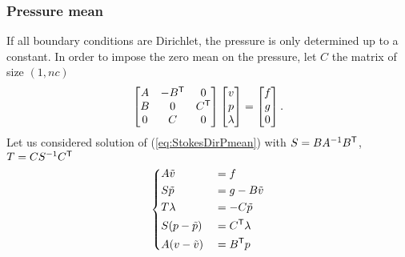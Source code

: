 \subsubsection{Pressure mean}
%
If all boundary conditions are Dirichlet, the pressure is only determined up to a constant. In order to impose the zero mean on the pressure, let $C$ the matrix of size $(1,nc)$
%
\begin{equation}\label{eq:StokesDirPmean}
\begin{bmatrix}
A  & -{B}^{\mathsf{T}}& 0\\
B & 0 & {C}^{\mathsf{T}}\\
0 & C & 0
\end{bmatrix}
\begin{bmatrix}
v\\
p\\
\lambda
\end{bmatrix}
=
\begin{bmatrix}
f\\
g\\
0
\end{bmatrix}.
\end{equation}
%
Let us considered solution of (\ref{eq:StokesDirPmean}) with $S=BA^{-1}{B}^{\mathsf{T}}$, $T=CS^{-1}{C}^{\mathsf{T}}$
%
\begin{equation}\label{eq:}
%
\left\{
\begin{aligned}
&A \tilde v &&= f\\
&S \tilde p &&= g-B\tilde v\\
&T \lambda &&= -C\tilde p\\
&S (p-\tilde p) &&= \transpose{C} \lambda\\
&A(v-\tilde v) &&=  \transpose{B} p
\end{aligned}
\right.
%
\end{equation}
%

%
%
\printbibliography[title=References Section~\thesection]

